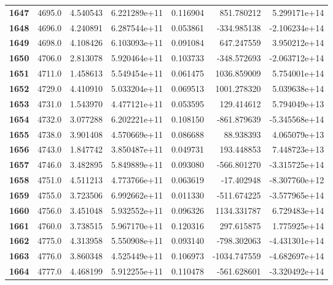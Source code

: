 \documentclass{report}[12pt]
\begin{document}
\begin{center}
\begin{tabular}{lrrrrrr}
\textbf{1647} &         4695.0 &   4.540543 &  6.221289e+11 &    0.116904 &   851.780212 &  5.299171e+14 \\
\textbf{1648} &         4696.0 &   4.240891 &  6.287544e+11 &    0.053861 &  -334.985138 & -2.106234e+14 \\
\textbf{1649} &         4698.0 &   4.108426 &  6.103093e+11 &    0.091084 &   647.247559 &  3.950212e+14 \\
\textbf{1650} &         4706.0 &   2.813078 &  5.920464e+11 &    0.103733 &  -348.572693 & -2.063712e+14 \\
\textbf{1651} &         4711.0 &   1.458613 &  5.549454e+11 &    0.061475 &  1036.859009 &  5.754001e+14 \\
\textbf{1652} &         4729.0 &   4.410910 &  5.033204e+11 &    0.069513 &  1001.278320 &  5.039638e+14 \\
\textbf{1653} &         4731.0 &   1.543970 &  4.477121e+11 &    0.053595 &   129.414612 &  5.794049e+13 \\
\textbf{1654} &         4732.0 &   3.077288 &  6.202221e+11 &    0.108150 &  -861.879639 & -5.345568e+14 \\
\textbf{1655} &         4738.0 &   3.901408 &  4.570669e+11 &    0.086688 &    88.938393 &  4.065079e+13 \\
\textbf{1656} &         4743.0 &   1.847742 &  3.850487e+11 &    0.049731 &   193.448853 &  7.448723e+13 \\
\textbf{1657} &         4746.0 &   3.482895 &  5.849889e+11 &    0.093080 &  -566.801270 & -3.315725e+14 \\
\textbf{1658} &         4751.0 &   4.511213 &  4.773766e+11 &    0.063619 &   -17.402948 & -8.307760e+12 \\
\textbf{1659} &         4755.0 &   3.723506 &  6.992662e+11 &    0.011330 &  -511.674225 & -3.577965e+14 \\
\textbf{1660} &         4756.0 &   3.451048 &  5.932552e+11 &    0.096326 &  1134.331787 &  6.729483e+14 \\
\textbf{1661} &         4760.0 &   3.738515 &  5.967170e+11 &    0.120316 &   297.615875 &  1.775925e+14 \\
\textbf{1662} &         4775.0 &   4.313958 &  5.550908e+11 &    0.093140 &  -798.302063 & -4.431301e+14 \\
\textbf{1663} &         4776.0 &   3.860348 &  4.525449e+11 &    0.106973 & -1034.747559 & -4.682697e+14 \\
\textbf{1664} &         4777.0 &   4.468199 &  5.912255e+11 &    0.110478 &  -561.628601 & -3.320492e+14 \\

\end{tabular}
\end{center}
\end{document}
